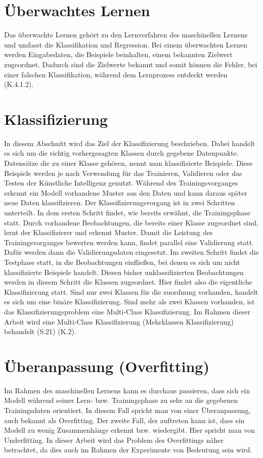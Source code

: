 \documentclass[12pt]{scrreprt}
\begin{document}
\section{Überwachtes Lernen}
Das überwachte Lernen gehört zu den Lernverfahren des maschinellen Lernens und umfasst die Klassifikation und Regression. Bei einem überwachten Lernen werden Eingabedaten, die Beispiele beinhalten, einem bekannten Zielwert zugeordnet. Dadurch sind die Zielwerte bekannt und somit können die Fehler, bei einer falschen Klassifikation, während dem Lernprozess entdeckt werden \cite{Chollet2018}(K.4.1.2).
	
\section{Klassifizierung}
	
In diesem Abschnitt wird das Ziel der Klassifizierung beschrieben. Dabei handelt es sich um die richtig vorhergesagten Klassen durch gegebene Datenpunkte. Datensätze die zu einer Klasse gehören, nennt man klassifizierte Beispiele. Diese Beispiele werden je nach Verwendung für das Trainieren, Validieren oder das Testen der Künstliche Intelligenz genutzt. Während des Trainingsvorganges erkennt ein Modell vorhandene Muster aus den Daten und kann daraus später neue Daten klassifizieren. Der Klassifizierungsvorgang ist in zwei Schritten unterteilt. In dem ersten Schritt findet, wie bereits erwähnt, die Trainingsphase statt. Durch vorhandene Beobachtungen, die bereits einer Klasse zugeordnet sind, lernt der Klassifizierer und erkennt Muster. Damit die Leistung des Trainingsvorganges bewerten werden kann, findet parallel eine Validierung statt. Dafür werden dann die Validierungsdaten eingesetzt. Im zweiten Schritt findet die Testphase statt, in die Beobachtungen einfließen, bei denen es sich um nicht klassifizierte Beispiele handelt. Diesen bisher unklassifizierten Beobachtungen werden in diesem Schritt die Klassen zugeordnet. Hier findet also die eigentliche Klassifizierung statt. Sind nur zwei Klassen für die zuordnung vorhanden, handelt es sich um eine binäre Klassifizierung. Sind mehr als zwei Klassen vorhanden, ist das Klassifizierungsproblem eine Multi-Class Klassifizierung. Im Rahmen dieser Arbeit wird eine Multi-Class Klassifizierung (Mehrklassen Klassifizierung) behandelt \cite{Frochte2021} (S.21) \cite{Asiri2018} \cite{Schoenbrodt2019} (K.2).
	
\section{Überanpassung (Overfitting)}
Im Rahmen des maschinellen Lernens kann es durchaus passieren, dass sich ein Modell während seiner Lern- bzw. Trainingsphase zu sehr an die gegebenen Trainingsdaten orientiert. In diesem Fall spricht man von einer Überanpassung, auch bekannt als Overfitting. Der zweite Fall, der auftreten kann ist, dass ein Modell zu wenig Zusammenhänge erkennt bzw. wiedergibt. Hier spricht man von Underfitting. In dieser Arbeit wird das Problem des Overfittings näher betrachtet, da dies auch im Rahmen der Experimente von Bedeutung sein wird.\\
\end{document}
